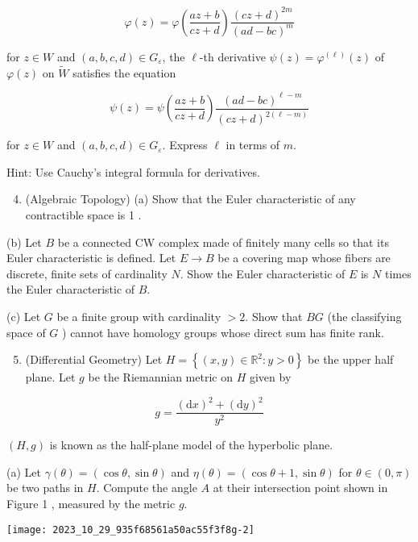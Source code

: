 \documentclass[10pt]{article}
\begin{document}
$$
\varphi(z)=\varphi\left(\frac{a z+b}{c z+d}\right) \frac{(c z+d)^{2 m}}{(a d-b c)^{m}}
$$

for $z \in W$ and $(a, b, c, d) \in G_{\varepsilon}$, the $\ell$-th derivative $\psi(z)=\varphi^{(\ell)}(z)$ of $\varphi(z)$ on $\tilde{W}$ satisfies the equation

$$
\psi(z)=\psi\left(\frac{a z+b}{c z+d}\right) \frac{(a d-b c)^{\ell-m}}{(c z+d)^{2(\ell-m)}}
$$

for $z \in W$ and $(a, b, c, d) \in G_{\varepsilon}$. Express $\ell$ in terms of $m$.

Hint: Use Cauchy's integral formula for derivatives.

\begin{enumerate}
  \setcounter{enumi}{3}
  \item (Algebraic Topology) (a) Show that the Euler characteristic of any contractible space is 1 .
\end{enumerate}

(b) Let $B$ be a connected CW complex made of finitely many cells so that its Euler characteristic is defined. Let $E \rightarrow B$ be a covering map whose fibers are discrete, finite sets of cardinality $N$. Show the Euler characteristic of $E$ is $N$ times the Euler characteristic of $B$.

(c) Let $G$ be a finite group with cardinality $>2$. Show that $B G$ (the classifying space of $G$ ) cannot have homology groups whose direct sum has finite rank.

\begin{enumerate}
  \setcounter{enumi}{4}
  \item (Differential Geometry) Let $H=\left\{(x, y) \in \mathbb{R}^{2}: y>0\right\}$ be the upper half plane. Let $g$ be the Riemannian metric on $H$ given by
\end{enumerate}

$$
g=\frac{(\mathrm{d} x)^{2}+(\mathrm{d} y)^{2}}{y^{2}}
$$

$(H, g)$ is known as the half-plane model of the hyperbolic plane.

(a) Let $\gamma(\theta)=(\cos \theta, \sin \theta)$ and $\eta(\theta)=(\cos \theta+1, \sin \theta)$ for $\theta \in(0, \pi)$ be two paths in $H$. Compute the angle $A$ at their intersection point shown in Figure 1 , measured by the metric $g$.

\begin{center}
\texttt{[image: 2023\_10\_29\_935f68561a50ac55f3f8g-2]}
\end{center}
\end{document}
